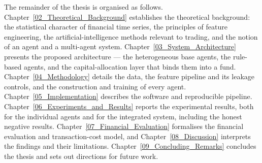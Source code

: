 The remainder of the thesis is organised as follows. Chapter~\ref{02_Theoretical_Background} establishes the theoretical background: the statistical character of financial time series, the principles of feature engineering, the artificial-intelligence methods relevant to trading, and the notion of an agent and a multi-agent system. Chapter~\ref{03_System_Architecture} presents the proposed architecture --- the heterogeneous base agents, the rule-based agents, and the capital-allocation layer that binds them into a fund. Chapter~\ref{04_Methodology} details the data, the feature pipeline and its leakage controls, and the construction and training of every agent. Chapter~\ref{05_Implementation} describes the software and reproducible pipeline. Chapter~\ref{06_Experiments_and_Results} reports the experimental results, both for the individual agents and for the integrated system, including the honest negative results. Chapter~\ref{07_Financial_Evaluation} formalises the financial evaluation and transaction-cost model, and Chapter~\ref{08_Discussion} interprets the findings and their limitations. Chapter~\ref{09_Concluding_Remarks} concludes the thesis and sets out directions for future work.
